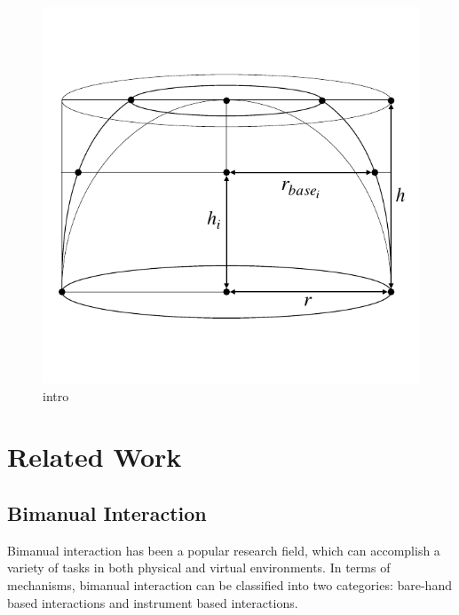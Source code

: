 \begin{figure}
  \includegraphics{f1.pdf}
\caption{intro}
\label{fig:1}       %
\end{figure}


\section{Related Work}
\label{sec:2}

\subsection{Bimanual Interaction}
\label{sec:2.1}
Bimanual interaction has been a popular research field, which can accomplish a variety of tasks in both physical and virtual environments.
In terms of mechanisms, bimanual interaction can be classified into two categories: bare-hand based interactions and instrument based interactions.

